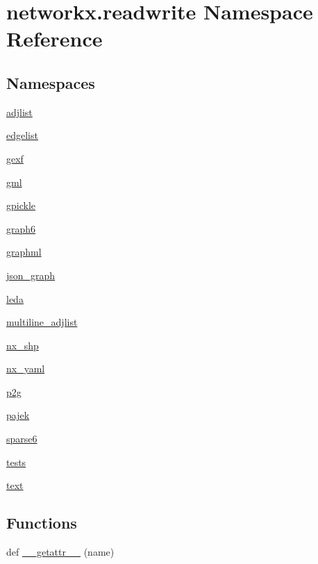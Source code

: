 \hypertarget{namespacenetworkx_1_1readwrite}{}\section{networkx.\+readwrite Namespace Reference}
\label{namespacenetworkx_1_1readwrite}
\subsection*{Namespaces}
\begin{DoxyCompactItemize}
\item 
 \hyperlink{namespacenetworkx_1_1readwrite_1_1adjlist}{adjlist}
\item 
 \hyperlink{namespacenetworkx_1_1readwrite_1_1edgelist}{edgelist}
\item 
 \hyperlink{namespacenetworkx_1_1readwrite_1_1gexf}{gexf}
\item 
 \hyperlink{namespacenetworkx_1_1readwrite_1_1gml}{gml}
\item 
 \hyperlink{namespacenetworkx_1_1readwrite_1_1gpickle}{gpickle}
\item 
 \hyperlink{namespacenetworkx_1_1readwrite_1_1graph6}{graph6}
\item 
 \hyperlink{namespacenetworkx_1_1readwrite_1_1graphml}{graphml}
\item 
 \hyperlink{namespacenetworkx_1_1readwrite_1_1json__graph}{json\+\_\+graph}
\item 
 \hyperlink{namespacenetworkx_1_1readwrite_1_1leda}{leda}
\item 
 \hyperlink{namespacenetworkx_1_1readwrite_1_1multiline__adjlist}{multiline\+\_\+adjlist}
\item 
 \hyperlink{namespacenetworkx_1_1readwrite_1_1nx__shp}{nx\+\_\+shp}
\item 
 \hyperlink{namespacenetworkx_1_1readwrite_1_1nx__yaml}{nx\+\_\+yaml}
\item 
 \hyperlink{namespacenetworkx_1_1readwrite_1_1p2g}{p2g}
\item 
 \hyperlink{namespacenetworkx_1_1readwrite_1_1pajek}{pajek}
\item 
 \hyperlink{namespacenetworkx_1_1readwrite_1_1sparse6}{sparse6}
\item 
 \hyperlink{namespacenetworkx_1_1readwrite_1_1tests}{tests}
\item 
 \hyperlink{namespacenetworkx_1_1readwrite_1_1text}{text}
\end{DoxyCompactItemize}
\subsection*{Functions}
\begin{DoxyCompactItemize}
\item 
def \hyperlink{namespacenetworkx_1_1readwrite_a4686bfe2cc0a399e43960c07d3488586}{\+\_\+\+\_\+getattr\+\_\+\+\_\+} (name)
\end{DoxyCompactItemize}


